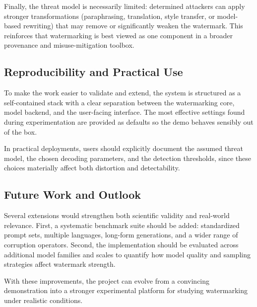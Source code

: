 Finally, the threat model is necessarily limited: determined attackers can apply stronger transformations (paraphrasing, translation, style transfer, or model-based rewriting) that may remove or significantly weaken the watermark. This reinforces that watermarking is best viewed as one component in a broader provenance and misuse-mitigation toolbox.

\subsection{Reproducibility and Practical Use}
To make the work easier to validate and extend, the system is structured as a self-contained stack with a clear separation between the watermarking core, model backend, and the user-facing interface. The most effective settings found during experimentation are provided as defaults so the demo behaves sensibly out of the box.

In practical deployments, users should explicitly document the assumed threat model, the chosen decoding parameters, and the detection thresholds, since these choices materially affect both distortion and detectability.

\subsection{Future Work and Outlook}
Several extensions would strengthen both scientific validity and real-world relevance. First, a systematic benchmark suite should be added: standardized prompt sets, multiple languages, long-form generations, and a wider range of corruption operators. Second, the implementation should be evaluated across additional model families and scales to quantify how model quality and sampling strategies affect watermark strength.

With these improvements, the project can evolve from a convincing demonstration into a stronger experimental platform for studying watermarking under realistic conditions.

